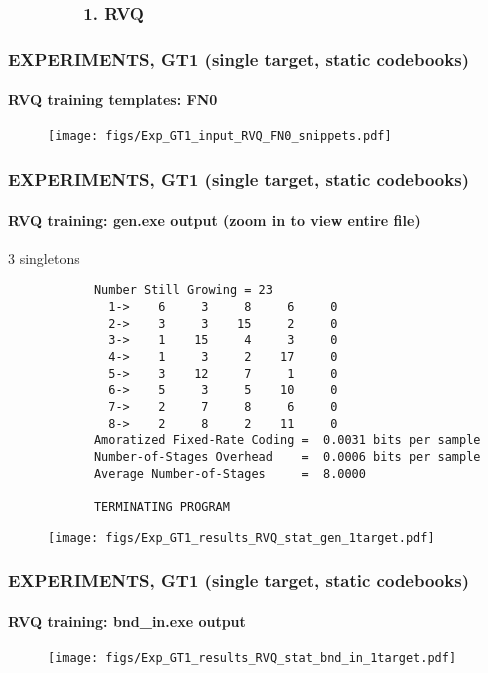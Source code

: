 \subsubsection{\ \ \ \ \ \ \ \ 1. RVQ}

\begin{frame}
\frametitle{\small EXPERIMENTS, GT1 (single target, static codebooks)}
\framesubtitle{RVQ training templates: FN0}
\mypagenum
	\begin{figure}
		\texttt{[image: figs/Exp\_GT1\_input\_RVQ\_FN0\_snippets.pdf]}
	\end{figure}
\end{frame}


\begin{frame}[fragile]
\frametitle{\small EXPERIMENTS, GT1 (single target, static codebooks)}
\framesubtitle{RVQ training: gen.exe output {\tiny (zoom in to view entire file)}}
\mypagenum
	\vspace{0.1in}
	3 singletons
		\tiny
		\begin{verbatim}
			Number Still Growing = 23
			  1->    6     3     8     6     0 
			  2->    3     3    15     2     0 
			  3->    1    15     4     3     0 
			  4->    1     3     2    17     0 
			  5->    3    12     7     1     0 
			  6->    5     3     5    10     0 
			  7->    2     7     8     6     0 
			  8->    2     8     2    11     0 
			Amoratized Fixed-Rate Coding =  0.0031 bits per sample
			Number-of-Stages Overhead    =  0.0006 bits per sample
			Average Number-of-Stages     =  8.0000
			
			TERMINATING PROGRAM
		\end{verbatim}
	\begin{figure}
		\texttt{[image: figs/Exp\_GT1\_results\_RVQ\_stat\_gen\_1target.pdf]}
	\end{figure}
\end{frame}



\begin{frame}
\frametitle{\small EXPERIMENTS, GT1 (single target, static codebooks)}
\framesubtitle{RVQ training: bnd\_in.exe output}
\mypagenum
	\begin{figure}
		\texttt{[image: figs/Exp\_GT1\_results\_RVQ\_stat\_bnd\_in\_1target.pdf]}
	\end{figure}
\end{frame}


